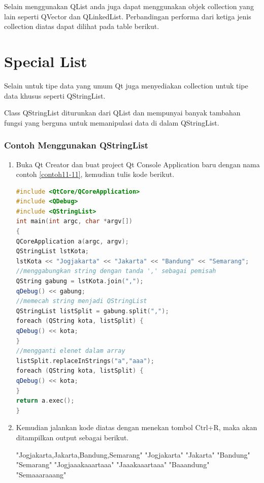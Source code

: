 Selain menggunakan QList anda juga dapat menggunakan objek collection
yang lain seperti QVector dan QLinkedList. Perbandingan performa dari
ketiga jenis collection diatas dapat dilihat pada table berikut.

\section{Special List}\label{special-list}

Selain untuk tipe data yang umum Qt juga menyediakan collection untuk
tipe data khusus seperti QStringList.

Class QStringList diturunkan dari QList dan mempunyai banyak tambahan
fungsi yang berguna untuk memanipulasi data di dalam QStringList.

\subsubsection*{Contoh Menggunakan QStringList}

\begin{enumerate}

\item
  Buka Qt Creator dan buat project Qt Console Application baru dengan
  nama contoh \ref{contoh11-11}, kemudian tulis kode berikut.

\begin{lstlisting}[language=c++, caption=Menggunakan QStringList,label=contoh11-11]
#include <QtCore/QCoreApplication>
#include <QDebug>
#include <QStringList>
int main(int argc, char *argv[])
{
QCoreApplication a(argc, argv);
QStringList lstKota;
lstKota << "Jogjakarta" << "Jakarta" << "Bandung" << "Semarang";
//menggabungkan string dengan tanda ',' sebagai pemisah
QString gabung = lstKota.join(",");
qDebug() << gabung;
//memecah string menjadi QStringList
QStringList listSplit = gabung.split(",");
foreach (QString kota, listSplit) {
qDebug() << kota;
}
//mengganti elenet dalam array
listSplit.replaceInStrings("a","aaa");
foreach (QString kota, listSplit) {
qDebug() << kota;
}
return a.exec();
}
\end{lstlisting}
\item
  Kemudian jalankan kode diatas dengan menekan tombol Ctrl+R, maka akan
  ditampilkan output sebagai berikut.

\begin{lcverbatim}
"Jogjakarta,Jakarta,Bandung,Semarang"
"Jogjakarta"
"Jakarta"
"Bandung"
"Semarang"
"Jogjaaakaaartaaa"
"Jaaakaaartaaa"
"Baaandung"
"Semaaaraaang"
\end{lcverbatim}
\end{enumerate}

